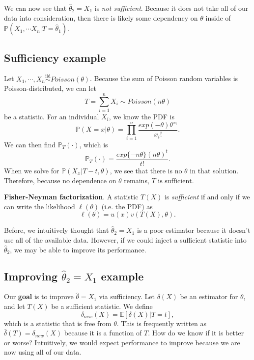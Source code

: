\documentclass[titlepage, 12pt, leqno]{article}
\begin{document}
We can now see that $\hat \theta_{2} = X_{1}$ is \textit{not sufficient}. 
Because it does not take all of our data into consideration, then there is
likely some dependency on $\theta$ inside of $\mathbb{P}(X_{1}, \cdots X_{n} |
T = \hat \theta_{1})$.

\subsection{Sufficiency example}
Let $X_{1}, \cdots , X_{n} \overset{\mathrm{iid}}{\sim} Poisson(\theta)$. 
Because the sum of Poisson random variables is Poisson-distributed, we can let
\[
T = \sum_{i=1}^{n}X_{i} \sim Poisson(n\theta)
\]
be a statistic. For an individual $X_{i}$, we know the PDF is
\[
\mathbb{P}(X=x|\theta) = \prod_{i=1}^{n} \frac{exp(-\theta)\theta^{x_{i}}}
{x_{i}!}.
\]
We can then find $\mathbb{P}_{T}(\cdot)$, which is
\[
    \mathbb{P}_{T}(\cdot) = \frac{exp\{-n\theta\}(n\theta)^{t}}{t!}.
\]
When we solve for $\mathbb{P}(X_{x}|T-t, \theta)$, we see that there is no
 $\theta$ in that solution. Therefore, because no dependence on $\theta$ remains,
 $\boxed{ \text{$T$ is sufficient}}$.

\begin{definition}
    \textbf{Fisher-Neyman factorization}.
    A statistic $T(X)$ is \textit{sufficient} if and only if we can write the
    likelihood $\ell(\theta)$ (i.e. the PDF) as
    \[
    \ell(\theta) = u(x) v(T(X),\theta).
    \]
\end{definition}

Before, we intuitively thought that $\hat \theta_{2} = X_{1}$ is a poor estimator
because it doesn't use all of the available data. However, if we could inject
a sufficient statistic into $\hat \theta_{2}$, we may be able to improve its
performance.

\subsection{Improving $\hat \theta_{2} = X_{1}$ example}

Our \textbf{goal} is to improve $\hat \theta = X_{1}$ via sufficiency. Let
 $\delta(X)$ be an estimator for $\theta$, and let $T(X)$ be a sufficient
statistic. We define
\[
    \delta_{new}(X) = \mathbb{E}[\delta(X)|T=t],
\]
which is a statistic that is free from $\theta$. This is frequently written as
 $\bar \delta(T) = \delta_{new}(X)$ because it is a function of $T$. How do we
 know if it is better or worse? Intuitively, we would expect performance to
 improve because we are now using all of our data.
\end{document}
